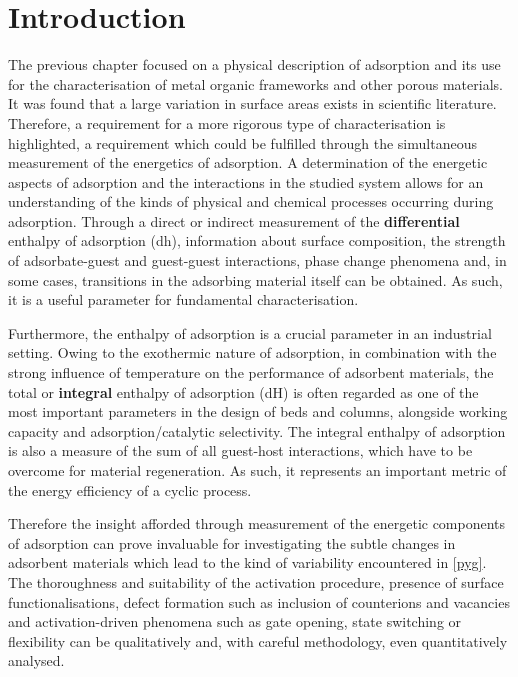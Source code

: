 
\section{Introduction}

The previous chapter focused on a physical description
of adsorption and its use for the characterisation of
metal organic frameworks and other porous materials. It was found that 
a large variation in surface areas exists in scientific literature.
Therefore, a requirement for a more rigorous type of characterisation
is highlighted, a requirement which could be fulfilled through the 
simultaneous measurement of the energetics of adsorption. 
A determination of the energetic aspects of adsorption 
and the interactions in the studied system allows for an understanding 
of the kinds of physical and chemical processes occurring
during adsorption. Through a direct or indirect measurement
of the \textbf{differential} enthalpy of adsorption 
(\gls{dh}), information about surface composition, 
the strength of adsorbate-guest and guest-guest interactions, 
phase change phenomena and, in some cases, transitions in the
adsorbing material itself can be obtained. As such, it is a useful
parameter for fundamental characterisation.

Furthermore, the enthalpy of adsorption is a crucial parameter
in an industrial setting. Owing to the exothermic nature of
adsorption, in combination with the strong influence of temperature
on the performance of adsorbent materials, the total or 
\textbf{integral} enthalpy of adsorption (\gls{dH}) is
often regarded as one of the most important parameters in the
design of beds and columns, alongside working capacity and
adsorption/catalytic selectivity. The integral enthalpy of adsorption
is also a measure of the sum of all guest-host interactions, which
have to be overcome for material regeneration. As such, it
represents an important metric of the energy efficiency
of a cyclic process.

Therefore the insight afforded through measurement of
the energetic components of adsorption can prove invaluable
for investigating the subtle changes in adsorbent materials
which lead to the kind of variability encountered in
\autoref{pyg}. The thoroughness and suitability of the activation
procedure, presence of surface functionalisations, defect
formation such as inclusion of counterions and vacancies
and activation-driven phenomena such as gate opening,
state switching or flexibility can be qualitatively and,
with careful methodology, even quantitatively analysed.

